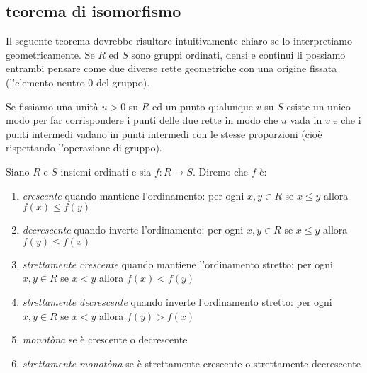 \subsection{teorema di isomorfismo}
\label{sec:isomorfismo}

% 
% 
Il seguente teorema dovrebbe risultare intuitivamente chiaro 
se lo interpretiamo geometricamente. 
Se $R$ ed $S$ sono gruppi ordinati, densi e continui li possiamo 
entrambi pensare come due diverse rette geometriche con una origine fissata
(l'elemento neutro $0$ del gruppo).

Se fissiamo una unità $u>0$ su $R$ ed un punto qualunque $v$ su $S$ 
esiste un unico modo per far corrispondere i punti delle due rette 
in modo che $u$ vada in $v$ e che i punti intermedi vadano in punti 
intermedi con le stesse proporzioni (cioè rispettando l'operazione
di gruppo).

\begin{definition}
  \label{def:monotonia}%
  Siano $R$ e $S$ insiemi ordinati 
  e sia $f\colon R\to S$.
  Diremo che $f$ è:
  \begin{enumerate}
    \item \emph{crescente} quando mantiene l'ordinamento: 
    per ogni $x,y\in R$ se $x\le y$ allora $f(x) \le f(y)$
    \item \emph{decrescente} quando inverte l'ordinamento: 
    per ogni $x,y\in R$ se $x\le y$ allora $f(y) \le f(x)$
    \item \emph{strettamente crescente} quando mantiene l'ordinamento stretto: 
    per ogni $x,y\in R$ se $x < y$ allora $f(x) < f(y)$
    \item \emph{strettamente decrescente} quando inverte l'ordinamento stretto: 
    per ogni $x,y\in R$ se $x < y$ allora $f(y) > f(x)$
    \item \emph{monotòna} se è crescente o decrescente
    \item \emph{strettamente monotòna} se è strettamente crescente 
    o strettamente decrescente
  \end{enumerate}
\end{definition}

